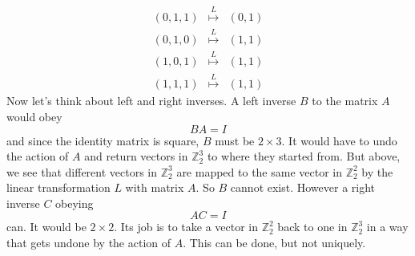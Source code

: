 {\[\begin{array}{ccc}
(0,1,1)&\stackrel{L}\mapsto&(0,1)\\[2mm]
(0,1,0)&\stackrel{L}\mapsto&(1,1)\\
(1,0,1)&\stackrel{L}\mapsto&(1,1)\\
(1,1,1)&\stackrel{L}\mapsto&(1,1)
\end{array}
\]
Now let's think about left and right inverses. A left inverse $B$ to the matrix $A$
would obey
\[
BA=I
\]
and since the identity matrix is square, $B$ must be $2\times3$. It would have to undo the action of $A$ and return vectors in ${\mathbb Z}_2^3$
to where they started from. But above, we see that different vectors in ${\mathbb Z}_2^3$ are mapped to the same vector in ${\mathbb Z}_2^2$
by the linear transformation $L$ with matrix $A$. So $B$ cannot exist. However a right inverse $C$ obeying
\[
AC=I
\]
can. It would be $2\times2$. Its job is to take a vector in ${\mathbb Z}_2^2$ back to one in ${\mathbb Z}_2^3$ in a way that gets undone by the action of $A$.
This can be done, but not uniquely. 

} %

